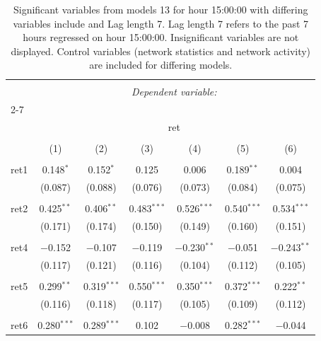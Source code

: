 
\begin{table}[!htbp] \centering 
  \caption{Significant variables from models 13 for hour 15:00:00 with differing variables include 
                               and Lag length 7. Lag length 7 refers to the past 7 hours regressed on hour 15:00:00. 
                               Insignificant variables are not displayed. 
                               Control variables (network statistics and network activity) are 
                               included for differing models.} 
  \label{RVmodels1_t_hourlagged2} 
\scriptsize 
\begin{tabular}{@{\extracolsep{5pt}}lcccccc} 
\\[-1.8ex]\hline 
\hline \\[-1.8ex] 
 & \multicolumn{6}{c}{\textit{Dependent variable:}} \\ 
\cline{2-7} 
\\[-1.8ex] & \multicolumn{6}{c}{ret} \\ 
\\[-1.8ex] & (1) & (2) & (3) & (4) & (5) & (6)\\ 
\hline \\[-1.8ex] 
 ret1 & 0.148$^{*}$ & 0.152$^{*}$ & 0.125 & 0.006 & 0.189$^{**}$ & 0.004 \\ 
  & (0.087) & (0.088) & (0.076) & (0.073) & (0.084) & (0.075) \\ 
  & & & & & & \\ 
 ret2 & 0.425$^{**}$ & 0.406$^{**}$ & 0.483$^{***}$ & 0.526$^{***}$ & 0.540$^{***}$ & 0.534$^{***}$ \\ 
  & (0.171) & (0.174) & (0.150) & (0.149) & (0.160) & (0.151) \\ 
  & & & & & & \\ 
 ret4 & $-$0.152 & $-$0.107 & $-$0.119 & $-$0.230$^{**}$ & $-$0.051 & $-$0.243$^{**}$ \\ 
  & (0.117) & (0.121) & (0.116) & (0.104) & (0.112) & (0.105) \\ 
  & & & & & & \\ 
 ret5 & 0.299$^{**}$ & 0.319$^{***}$ & 0.550$^{***}$ & 0.350$^{***}$ & 0.372$^{***}$ & 0.222$^{**}$ \\ 
  & (0.116) & (0.118) & (0.117) & (0.105) & (0.109) & (0.112) \\ 
  & & & & & & \\ 
 ret6 & 0.280$^{***}$ & 0.289$^{***}$ & 0.102 & $-$0.008 & 0.282$^{***}$ & $-$0.044 \\ 

\end{tabular}
\end{table}
